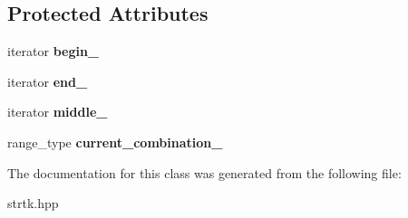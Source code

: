 \subsection*{Protected Attributes}
\begin{DoxyCompactItemize}
\item 
\hypertarget{classstrtk_1_1combination__iterator_ad531f0a602f1f0f7d32e2d5b29be0ef0}{iterator {\bfseries begin\-\_\-}}\label{classstrtk_1_1combination__iterator_ad531f0a602f1f0f7d32e2d5b29be0ef0}

\item 
\hypertarget{classstrtk_1_1combination__iterator_ad0b2f155a56a8208d6665a3af950dca7}{iterator {\bfseries end\-\_\-}}\label{classstrtk_1_1combination__iterator_ad0b2f155a56a8208d6665a3af950dca7}

\item 
\hypertarget{classstrtk_1_1combination__iterator_af929ba9e7594f142f5e045f272dd3d17}{iterator {\bfseries middle\-\_\-}}\label{classstrtk_1_1combination__iterator_af929ba9e7594f142f5e045f272dd3d17}

\item 
\hypertarget{classstrtk_1_1combination__iterator_a0ddc829574dec0e41686683d4dc8e787}{range\-\_\-type {\bfseries current\-\_\-combination\-\_\-}}\label{classstrtk_1_1combination__iterator_a0ddc829574dec0e41686683d4dc8e787}

\end{DoxyCompactItemize}


The documentation for this class was generated from the following file\-:\begin{DoxyCompactItemize}
\item 
strtk.\-hpp\end{DoxyCompactItemize}

